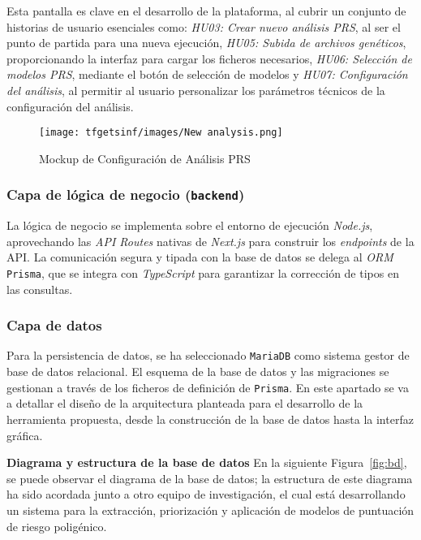 Esta pantalla es clave en el desarrollo de la plataforma, al cubrir un conjunto de historias de usuario esenciales como: \textit{HU03: Crear nuevo análisis PRS}, al ser el punto de partida para una nueva ejecución, \textit{HU05: Subida de archivos genéticos}, proporcionando la interfaz para cargar los ficheros necesarios, \textit{HU06: Selección de modelos PRS}, mediante el botón de selección de modelos y \textit{HU07: Configuración del análisis}, al permitir al usuario personalizar los parámetros técnicos de la configuración del análisis.

\begin{figure}[H]
    \centering
    \texttt{[image: tfgetsinf/images/New analysis.png]}
    \caption{Mockup de Configuración de Análisis PRS}
    \label{fig:mockup-configuración}
\end{figure}


\subsubsection{Capa de lógica de negocio (\texttt{backend})}
La lógica de negocio se implementa sobre el entorno de ejecución \textit{Node.js}, aprovechando las \textit{API Routes} nativas de \textit{Next.js} para construir los \textit{endpoints} de la API. La comunicación segura y tipada con la base de datos se delega al \textit{ORM} \texttt{Prisma}, que se integra con \textit{TypeScript} para garantizar la corrección de tipos en las consultas.

\subsubsection{Capa de datos}
Para la persistencia de datos, se ha seleccionado \texttt{MariaDB} como sistema gestor de base de datos relacional. El esquema de la base de datos y las migraciones se gestionan a través de los ficheros de definición de \texttt{Prisma}.
En este apartado se va a detallar el diseño de la arquitectura planteada para el desarrollo de la herramienta propuesta, desde la construcción de la base de datos hasta la interfaz gráfica.

\textbf{Diagrama y estructura de la base de datos}
En la siguiente Figura~\ref{fig:bd}, se puede observar el diagrama de la base de datos; la estructura de este diagrama ha sido acordada junto a otro equipo de investigación, el cual está desarrollando un sistema para la extracción, priorización y aplicación de modelos de puntuación de riesgo poligénico.

